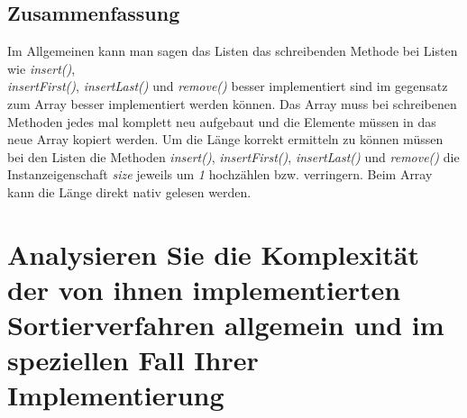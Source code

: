 \documentclass[a4paper, 11pt]{article}
\begin{document}
\subsection*{Zusammenfassung}
Im Allgemeinen kann man sagen das Listen das schreibenden Methode bei Listen wie \textit{insert()}, \\
\textit{insertFirst()}, \textit{insertLast()} und \textit{remove()} besser implementiert sind im gegensatz zum Array
besser implementiert werden können. Das Array muss bei schreibenen Methoden jedes mal komplett neu aufgebaut und die
Elemente müssen in das neue Array kopiert werden. Um die Länge korrekt ermitteln zu können müssen bei den Listen die
Methoden \textit{insert()}, \textit{insertFirst()}, \textit{insertLast()} und \textit{remove()}  die Instanzeigenschaft
\textit{size} jeweils um \textit{1} hochzählen bzw. verringern. Beim Array kann die Länge direkt nativ gelesen werden.

\section*{Analysieren Sie die Komplexität der von ihnen implementierten Sortierverfahren
          allgemein und im speziellen Fall Ihrer Implementierung}
\end{document}
